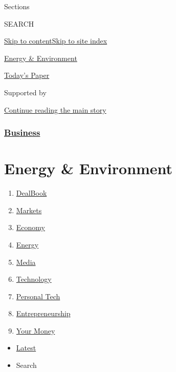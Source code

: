 Sections

SEARCH

\protect\hyperlink{site-content}{Skip to
content}\protect\hyperlink{site-index}{Skip to site index}

\href{https://www.nytimes.com/section/business/energy-environment}{Energy
\& Environment}

\href{https://myaccount.nytimes.com/auth/login?response_type=cookie\&client_id=vi}{}

\href{https://www.nytimes.com/section/todayspaper}{Today's Paper}

Supported by

\protect\hyperlink{after-sponsor}{Continue reading the main story}

\hypertarget{business}{%
\subsubsection{\texorpdfstring{\href{/section/business}{Business}}{Business}}\label{business}}

\hypertarget{energy--environment}{%
\section{Energy \& Environment}\label{energy--environment}}

\begin{enumerate}
\def\labelenumi{\arabic{enumi}.}
\tightlist
\item
  \href{/pages/business/dealbook/index.html}{DealBook}
\item
  \href{https://markets.on.nytimes.com}{Markets}
\item
  \href{/section/business/economy}{Economy}
\item
  \href{/section/business/energy-environment}{Energy}
\item
  \href{/section/business/media}{Media}
\item
  \href{/section/technology}{Technology}
\item
  \href{/section/technology/personaltech}{Personal Tech}
\item
  \href{/section/business/smallbusiness}{Entrepreneurship}
\item
  \href{/section/your-money}{Your Money}
\end{enumerate}

\begin{itemize}
\tightlist
\item
  \protect\hyperlink{stream-panel}{Latest}
\item
  Search
\end{itemize}

